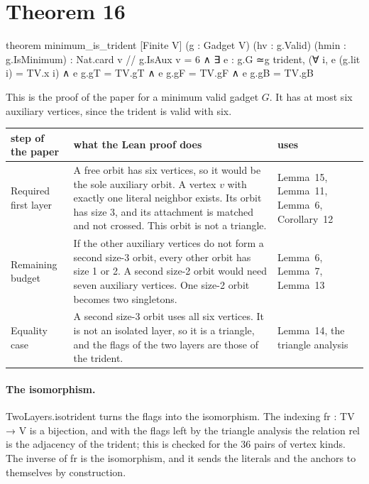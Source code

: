 \documentclass[11pt,a4paper]{article}
\newcommand{\leanus}{\textunderscore\allowbreak}
\newcommand{\lean}[1]{{\ttfamily\let\_\leanus #1}}
\begin{document}
\section{Theorem 16}\label{sec:thm16}

\begin{code}
theorem minimum_is_trident [Finite V] (g : Gadget V) (hv : g.Valid) (hmin : g.IsMinimum) :
    Nat.card {v // g.IsAux v} = 6 ∧ ∃ e : g.G ≃g trident,
      (∀ i, e (g.lit i) = TV.x i) ∧ e g.gT = TV.gT ∧ e g.gF = TV.gF ∧ e g.gB = TV.gB
\end{code}
This is the proof of the paper for a minimum valid gadget $G$. It has at most
six auxiliary vertices, since the trident is valid with six.

\begin{center}
\begin{tabular}{@{}p{}p{}p{}@{}}
\toprule
step of the paper & what the Lean proof does & uses\\
\midrule
Required first layer & A free orbit has six vertices, so it would be the
sole auxiliary orbit. A vertex $v$ with exactly one literal neighbor exists.
Its orbit has size 3, and its attachment is matched and not crossed. This
orbit is not a triangle. & Lemma~15, Lemma~11, Lemma~6, Corollary~12\\
\addlinespace
Remaining budget & If the other auxiliary vertices do not form a second
size-3 orbit, every other orbit has size 1 or 2. A second size-2 orbit would
need seven auxiliary vertices. One size-2 orbit becomes two singletons. &
Lemma~6, Lemma~7, Lemma~13\\
\addlinespace
Equality case & A second size-3 orbit uses all six vertices. It is not an
isolated layer, so it is a triangle, and the flags of the two layers are
those of the trident. & Lemma~14, the triangle analysis\\
\bottomrule
\end{tabular}
\end{center}

\paragraph{The isomorphism.} \lean{TwoLayers.iso\_trident} turns the flags
into the isomorphism. The indexing \lean{fr : TV → V} is a bijection, and
with the flags left by the triangle analysis the relation \lean{rel} is the
adjacency of the trident; this is checked for the 36 pairs of vertex kinds.
The inverse of \lean{fr} is the isomorphism, and it sends the literals and
the anchors to themselves by construction.
\end{document}
